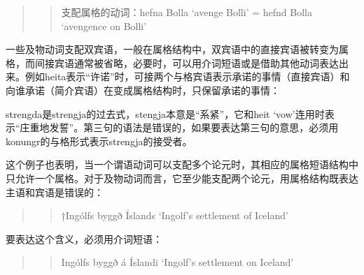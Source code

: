 \begin{enumerate}[itemindent=1em]
\begin{quote}
\begin{quote}
                  支配属格的动词：hefna Bolla `avenge Bolli' = hefnd Bolla `avengence on Bolli'
              \end{quote}


          \end{quote}

          一些及物动词支配双宾语，一般在属格结构中，双宾语中的直接宾语被转变为属格，而间接宾语通常被省略，必要时，可以用介词短语或是借助其他动词表达出来。例如heita表示“许诺”时，可接两个与格宾语表示承诺的事情（直接宾语）和向谁承诺（简介宾语）在变成属格结构时，只保留承诺的事情：
          \begin{exe}
              \ex
              \begin{xlist}
              \end{xlist}
          \end{exe}

          strengda是strengja的过去式，stengja本意是“系紧”，它和heit `vow'连用时表示“庄重地发誓”。第三句的语法是错误的，如果要表达第三句的意思，必须用konungr的与格形式表示strengja的接受者。

          这个例子也表明，当一个谓语动词可以支配多个论元时，其相应的属格短语结构中只允许一个属格。对于及物动词而言，它至少能支配两个论元，用属格结构既表达主语和宾语是错误的：
          \begin{quote}
              \begin{quote}
                  †Ingólfs byggð Íslands `Ingolf's settlement of Iceland'
              \end{quote}
          \end{quote}

          要表达这个含义，必须用介词短语：
          \begin{quote}
              \begin{quote}
                  Ingólfs byggð á Íslandi `Ingolf's settlement on Iceland'
              \end{quote}

          \end{quote}

\end{enumerate}

